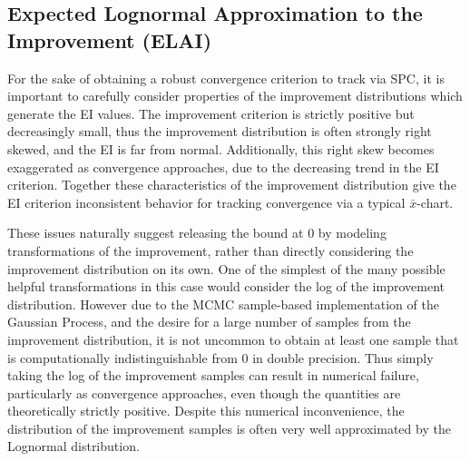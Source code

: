 \documentclass[12pt]{article}
\begin{document}
%
%
\subsection{Expected Lognormal Approximation to the Improvement (ELAI)}
%
%

%
For the sake of obtaining a robust convergence criterion to track via SPC, it is important to carefully consider properties of the improvement distributions which generate the EI values.
%
%
The improvement criterion is strictly positive but decreasingly small, thus the improvement distribution is often strongly right skewed, and the EI is far from normal.
%
Additionally, this right skew becomes exaggerated as convergence approaches, due to the decreasing trend in the EI criterion.
Together these characteristics of the improvement distribution give the EI criterion inconsistent behavior for tracking convergence via a typical $\bar x$-chart. 
 
%
%

These issues naturally suggest releasing the bound at 0 by modeling transformations of the improvement, rather than directly considering the improvement distribution on its own.
%
One of the simplest of the many possible helpful transformations in this case would consider the log of the improvement distribution. 
%
However due to the MCMC sample-based implementation of the Gaussian Process, and the desire for a large number of samples from the improvement distribution, it is not uncommon to obtain at least one sample that is computationally indistinguishable from 0 in double precision.
%
Thus simply taking the log of the improvement samples can result in numerical failure, particularly as convergence approaches, even though the quantities are theoretically strictly positive.
%
Despite this numerical inconvenience, the distribution of the improvement samples is often very well approximated by the Lognormal distribution. 

%
%
\end{document}
